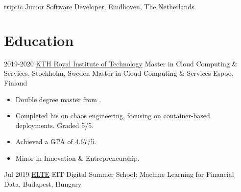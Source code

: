 {     
     {{\color{blue}\href{https://www.triptic.nl/}{triptic}}}
     {Junior Software Developer,}
     {Eindhoven, The Netherlands}
     {}{}
     {
     }
}


\section{Education}{
     \customcventry
     {2019-2020}
     {\color{blue}\href{https://kth.se/en}{KTH Royal Institute of Technology}}
     {Master in Cloud Computing \& Services,}
     {Stockholm, Sweden}
     {}{}{} %
     {\color{white}Master in Cloud Computing \& Services}
     {Espoo, Finland}{}{}
     {
     	\begin{itemize}[leftmargin=0.6cm, label={\textbullet}]
     		\item Double degree master from .
     		\item Completed his  on chaos engineering, focusing on container-based deployments. Graded 5/5.
     		\item Achieved a GPA of 4.67/5.
     		\item Minor in Innovation \& Entrepreneurship.
     	\end{itemize}
     }
     
     \customcventry
     {Jul 2019}
     {\color{blue}\href{https://www.elte.hu/en/}{ELTE}}
     {EIT Digital Summer School: Machine Learning for Financial Data,}
     {Budapest, Hungary}
     {}{}
     {
    \vspace{2mm} %
     }
    
}
